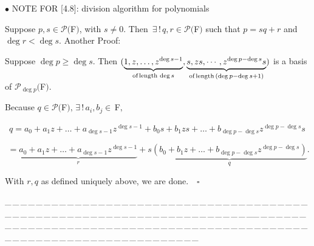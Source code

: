 \documentclass[a4paper, 11pt, UTF8]{article}
\def\Po{\mathcal{P}}
\def\Fbfc{$\,{\timesbf F}$}
\begin{document}
\begin{large}
{\small $\bullet$ } {\timesbf\Large N{\normalsize OTE} F{\normalsize OR} [4.8]:} {\timessl division algorithm for polynomials}\par\quad
{\timessl\normalsize Suppose $p, s\in\Po(${\timesbf F}$)$, with $s\neq 0$. Then $\,\exists\,!\,q, r\in\Po(${\timesbf F}$)$ such that $p = sq + r$ and $\deg r < \deg s$.} {\timessl\Large Another Proof:}\par\quad
Suppose $\deg p\geq \deg s$. Then $(\underbrace{1, z,\dots, z^{\deg s-1}}_{\textup{of\,length}\,\deg s},\underbrace{s,zs,\cdots,z^{\deg p-\deg s}s}_{\textup{of\,length}\,(\deg p-\deg s+1)})$ is a basis of $\Po_{\deg p}(${\timesbf F}$).$\par\quad
Because $q\in\Po(${\timesbf F}$),\,\exists\,!\,a_i,b_j\in\Fbfc,$\par\qquad\qquad\,\,\,$q=a_0+a_1 z+\dots+a_{\deg s-1}z^{\deg s-1}+ b_0 s+b_1 zs +\dots+ b_{\deg p-\deg s}z^{\deg p-\deg s}s$\par\qquad\qquad\quad\,\,$=\underbrace{a_0+a_1 z+\dots+a_{\deg s-1}z^{\deg s-1}}_{r}+s\underbrace{(b_0+b_1 z +\dots+ b_{\deg p-\deg s}z^{\deg p-\deg s})}_{q}.$\par\quad
With $r,q$ as defined uniquely above, we are done.$\quad\square$
\par
{\tiny \_\,\_\,\_\,\_\,\_\,\_\,\_\,\_\,\_\,\_\,\_\,\_\,\_\,\_\,\_\,\_\,\_\,\_\,\_\,\_\,\_\,\_\,\_\,\_\,\_\,\_\,\_\,\_\,\_\,\_\,\_\,\_\,\_\,\_\,\_\,\_\,\_\,\_\,\_\,\_\,\_\,\_\,\_\,\_\,\_\,\_\,\_\,\_\,\_\,\_\,\_\,\_\,\_\,\_\,\_\,\_\,\_\,\_\,\_\,\_\,\_\,\_\,\_\,\_\,\_\,\_\,\_\,\_\,\_\,\_\,\_\_\,\_\,\_\,\_\,\_\,\_\,\_\,\_\,\_\,\_\,\_\,\_\,\_\,\_\,\_\,\_\,\_\,\_\,\_\,\_\,\_\,\_\,\_\,\_\,\_\,\_\,\_\,\_\,\_\,\_\,\_\,\_\,\_\,\_\,\_\,\_\,\_\,\_\,\_\,\_\,\_\,\_\,\_\,\_\,\_\,\_\,\_\,\_\,\_\,\_\,\_\,\_\,\_\,\_\,\_\,\_\,\_\,\_\,\_\,\_\,\_\,\_\,\_\,\_\,\_\,\_\,\_\,\_\,\_\,\_\,\_}\par


\end{large}
\end{document}
